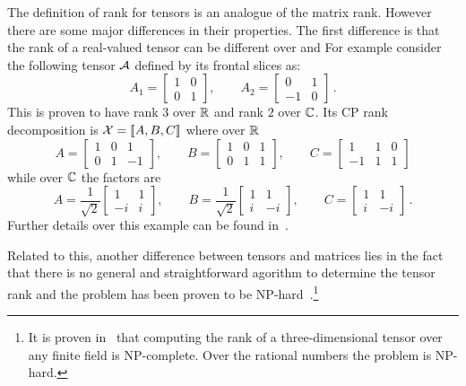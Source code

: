 The definition of rank for tensors is an analogue of the matrix rank. However there are some major differences in their properties.
The first difference is that the rank of a real-valued tensor can be different over \RR and \CC
For example consider the following tensor $\mathcal{A}$ defined by its frontal slices as:
\begin{equation*}
  A_1 = 
  \begin{bmatrix}
    1 & 0\\
    0 & 1
  \end{bmatrix}
  ,\qquad
  A_2 = 
  \begin{bmatrix}
    0 & 1\\
    -1 & 0
  \end{bmatrix}\, .
\end{equation*}
This is proven to have rank $3$ over $\mathbb{R}$ and rank $2$ over $\mathbb{C}$. Its CP rank decomposition is $\mathcal{X} = \llbracket A, B, C \rrbracket$ where over $\mathbb{R}$
\begin{equation*}
  A = 
  \begin{bmatrix}
    1 & 0 & 1\\
    0 & 1 & -1
  \end{bmatrix}
  ,\qquad
  B = 
  \begin{bmatrix}
    1 & 0 & 1\\
    0 & 1 & 1
  \end{bmatrix}
  ,\qquad
  C = 
  \begin{bmatrix}
    1 & 1 & 0\\
    -1 & 1 & 1
  \end{bmatrix}
\end{equation*}
while over $\mathbb{C}$ the factors are
\begin{equation*}
  A = \frac{1}{\sqrt{2}}
  \begin{bmatrix}
    1 & 1\\
    -i & i
  \end{bmatrix}
  ,\qquad
  B = \frac{1}{\sqrt{2}}
  \begin{bmatrix}
    1 & 1\\
    i & -i
  \end{bmatrix}
  ,\qquad
  C = 
  \begin{bmatrix}
    1 & 1\\
    i & -i
  \end{bmatrix}\, .
\end{equation*}
Further details over this example can be found in~\cite{tensorreview,kruskalstatement,ten1991kruskal,kruskal1989rank}.

Related to this, another difference between tensors and matrices lies in the fact that there is no general and straightforward agorithm to determine the tensor rank and the problem has been proven to be NP-hard~\cite{rankNP}.\footnote{It is proven in~\cite{rankNP} that computing the rank of a three-dimensional tensor over any finite field is NP-complete. Over the rational numbers the problem is NP-hard.}

